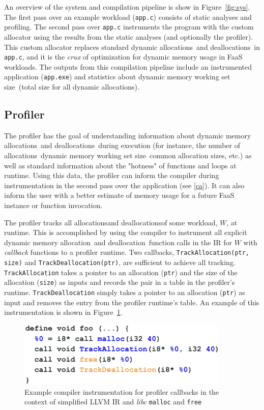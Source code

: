 \documentclass{article}
\def\ALL{allocation}
\def\DALL{deallocation}
\def\ALLS{allocations}
\def\DALLS{deallocations}
\def\DWS{dynamic memory working set size}
\begin{document}
An overview of the system and compilation pipeline is show in Figure~\ref{fig:sys}. The 
first pass over an example workload (\texttt{app.c}) consists of static analyses and 
profiling. The second pass over \texttt{app.c} instruments the program with the custom
allocator using the results from the static analyses (and optionally the profiler). This 
custom allocator replaces standard dynamic \ALLS\ and \DALLS\ in \texttt{app.c}, and it is
the \textit{crux} of optimization for dynamic memory usage in FaaS workloads. The
outputs from this compilation pipeline include an instrumented application (\texttt{app.exe})
and statistics about \DWS\ (total size for all dynamic \ALLS).

\subsection{Profiler}
The profiler has the goal of understanding information about dynamic memory \ALLS\ and 
\DALLS\ during execution (for instance, the number of \ALLS\, \DWS\, common \ALL 
sizes, etc.) as well as standard information about the "hotness" of functions and
loops at runtime. Using this data, the profiler can inform the compiler during 
instrumentation in the second pass over the application (see \ref{ca}). It can also 
inform the user with a better estimate of memory usage for a future FaaS instance or 
function invocation.

The profiler tracks all \ALLS and \DALLS of some workload, $W$, at runtime. This is 
accomplished by using the compiler to instrument all explicit dynamic memory \ALL\ and \DALL\ function 
calls in the IR for $W$ with \textit{callback} functions to a profiler runtime.
Two callbacks, \texttt{TrackAllocation(ptr, size)} and \texttt{TrackDeallocation(ptr)}, are 
sufficient to achieve all tracking. \texttt{TrackAllocation} takes a pointer to an allocation (\texttt{ptr}) and 
the size of the allocation (\texttt{size}) as inputs and records the pair in a table in the 
profiler's runtime. \texttt{TrackDeallocation} simply takes a pointer to an allocation (\texttt{ptr}) as
input and removes the entry from the profiler runtime's table. An example of this 
instrumentation is shown in Figure~\ref{fig:pins}.

\begin{figure}
    \centering
    \begin{minipage}{0.45\textwidth}
        \centering
        \includegraphics[width=0.9\textwidth]{figs/pins.png} 
        \caption{Example compiler instrumentation for profiler callbacks in the 
        context of simplified LLVM IR and \textit{libc} \texttt{malloc}
        and \texttt{free}}  
	    \label{fig:pins}
    \end{minipage}\hfill
\end{figure}
\end{document}
